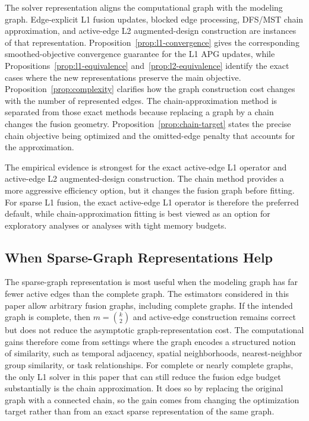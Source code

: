 \documentclass[twoside,11pt]{article}
\begin{document}
The solver representation aligns the computational graph with the modeling graph. 
Edge-explicit L1 fusion updates, blocked edge processing, DFS/MST chain approximation, and active-edge L2 augmented-design construction are instances of that representation. 
Proposition~\ref{prop:l1-convergence} gives the corresponding smoothed-objective convergence guarantee for the L1 APG updates, while Propositions~\ref{prop:l1-equivalence} and~\ref{prop:l2-equivalence} identify the exact cases where the new representations preserve the main objective.
Proposition~\ref{prop:complexity} clarifies how the graph construction cost changes with the number of represented edges.
The chain-approximation method is separated from those exact methods because replacing a graph by a chain changes the fusion geometry.
Proposition~\ref{prop:chain-target} states the precise chain objective being optimized and the omitted-edge penalty that accounts for the approximation.

The empirical evidence is strongest for the exact active-edge L1 operator and active-edge L2 augmented-design construction. 
The chain method provides a more aggressive efficiency option, but it changes the fusion graph before fitting.
For sparse L1 fusion, the exact active-edge L1 operator is therefore the preferred default, while chain-approximation fitting is best viewed as an option for exploratory analyses or analyses with tight memory budgets.


\subsection{When Sparse-Graph Representations Help}
The sparse-graph representation is most useful when the modeling graph has far fewer active edges than the complete graph. 
The estimators considered in this paper allow arbitrary fusion graphs, including complete graphs. 
If the intended graph is complete, then $m=\binom{k}{2}$ and active-edge construction remains correct but does not reduce the asymptotic graph-representation cost.
The computational gains therefore come from settings where the graph encodes a structured notion of similarity, such as temporal adjacency, spatial neighborhoods, nearest-neighbor group similarity, or task relationships.
For complete or nearly complete graphs, the only L1 solver in this paper that can still reduce the fusion edge budget substantially is the chain approximation. 
It does so by replacing the original graph with a connected chain, so the gain comes from changing the optimization target rather than from an exact sparse representation of the same graph. 
\end{document}
